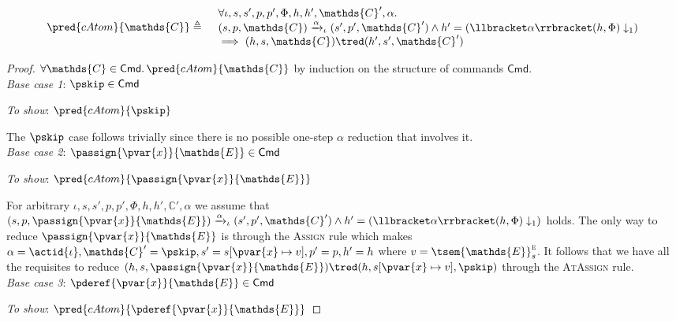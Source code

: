\begin{lem}
	\label{lem:catom}
	\[
	\begin{array}{r l}
		\pred{cAtom}{\mathds{C}} \triangleq&
		\begin{array}{l}
		\forall \iota, s, s', p, p', \Phi, h, h', \mathds{C}', \alpha \ldotp \\
		(s, p, \mathds{C}) \xrightarrow{\alpha}_\iota (s', p', \mathds{C}') \land h' = \left( \llbracket \alpha \rrbracket(h, \Phi) \downarrow_1 \right) \\
		\implies
		(h, s, \mathds{C}) \tred (h', s', \mathds{C}')
		\end{array}
	\end{array}
	\]
	
	{\parindent0pt
	\begin{proof}
	$\forall \mathds{C} \in \mathsf{Cmd} \ldotp \pred{cAtom}{\mathds{C}}$ by induction on the structure of commands $\mathsf{Cmd}$. \\
	
	\textit{Base case 1}: $\pskip \in \mathsf{Cmd}$
	
	\textit{To show}: $\pred{cAtom}{\pskip}$
	
	The $\pskip$ case follows trivially since there is no possible one-step $\alpha$ reduction that involves it. \\
	
	\textit{Base case 2}: $\passign{\pvar{x}}{\mathds{E}} \in \mathsf{Cmd}$
	
	\textit{To show}: $\pred{cAtom}{\passign{\pvar{x}}{\mathds{E}}}$
	
	For arbitrary $\iota, s, s', p, p', \Phi, h, h', \mathds{C}', \alpha$ we assume that $(s, p, \passign{\pvar{x}}{\mathds{E}}) \xrightarrow{\alpha}_\iota (s', p', \mathds{C}') \land h' = \left( \llbracket \alpha \rrbracket(h, \Phi) \downarrow_1 \right)$ holds. The only way to reduce $\passign{\pvar{x}}{\mathds{E}}$ is through the \textsc{Assign} rule which makes $\alpha = \actid{\iota}, \mathds{C}' = \pskip, s' = s[\pvar{x} \mapsto v], p' = p, h' = h$ where $v = \tsem{\mathds{E}}_s^\textsc{e}$. It follows that we have all the requisites to reduce $(h, s, \passign{\pvar{x}}{\mathds{E}}) \tred (h, s[\pvar{x} \mapsto v], \pskip)$ through the \textsc{AtAssign} rule. \\
	
	\textit{Base case 3}: $\pderef{\pvar{x}}{\mathds{E}} \in \mathsf{Cmd}$
	
	\textit{To show}: $\pred{cAtom}{\pderef{\pvar{x}}{\mathds{E}}}$
	

\end{proof}}
\end{lem}
